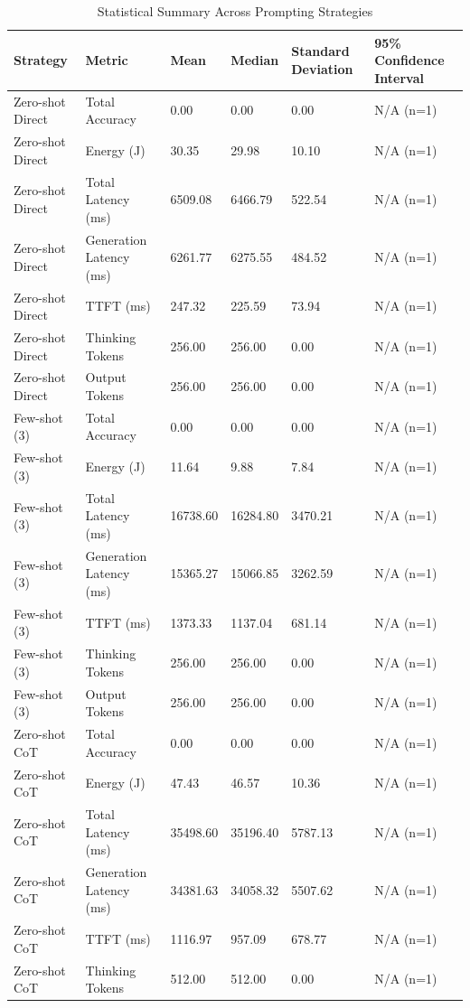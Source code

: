 \begin{table}
\caption{Statistical Summary Across Prompting Strategies}
\label{tab:statistical_summary}
\begin{tabular}{llllll}
\toprule
Strategy & Metric & Mean & Median & Standard Deviation & 95\% Confidence Interval \\
\midrule
Zero-shot Direct & Total Accuracy & 0.00 & 0.00 & 0.00 & N/A (n=1) \\
Zero-shot Direct & Energy (J) & 30.35 & 29.98 & 10.10 & N/A (n=1) \\
Zero-shot Direct & Total Latency (ms) & 6509.08 & 6466.79 & 522.54 & N/A (n=1) \\
Zero-shot Direct & Generation Latency (ms) & 6261.77 & 6275.55 & 484.52 & N/A (n=1) \\
Zero-shot Direct & TTFT (ms) & 247.32 & 225.59 & 73.94 & N/A (n=1) \\
Zero-shot Direct & Thinking Tokens & 256.00 & 256.00 & 0.00 & N/A (n=1) \\
Zero-shot Direct & Output Tokens & 256.00 & 256.00 & 0.00 & N/A (n=1) \\
Few-shot (3) & Total Accuracy & 0.00 & 0.00 & 0.00 & N/A (n=1) \\
Few-shot (3) & Energy (J) & 11.64 & 9.88 & 7.84 & N/A (n=1) \\
Few-shot (3) & Total Latency (ms) & 16738.60 & 16284.80 & 3470.21 & N/A (n=1) \\
Few-shot (3) & Generation Latency (ms) & 15365.27 & 15066.85 & 3262.59 & N/A (n=1) \\
Few-shot (3) & TTFT (ms) & 1373.33 & 1137.04 & 681.14 & N/A (n=1) \\
Few-shot (3) & Thinking Tokens & 256.00 & 256.00 & 0.00 & N/A (n=1) \\
Few-shot (3) & Output Tokens & 256.00 & 256.00 & 0.00 & N/A (n=1) \\
Zero-shot CoT & Total Accuracy & 0.00 & 0.00 & 0.00 & N/A (n=1) \\
Zero-shot CoT & Energy (J) & 47.43 & 46.57 & 10.36 & N/A (n=1) \\
Zero-shot CoT & Total Latency (ms) & 35498.60 & 35196.40 & 5787.13 & N/A (n=1) \\
Zero-shot CoT & Generation Latency (ms) & 34381.63 & 34058.32 & 5507.62 & N/A (n=1) \\
Zero-shot CoT & TTFT (ms) & 1116.97 & 957.09 & 678.77 & N/A (n=1) \\
Zero-shot CoT & Thinking Tokens & 512.00 & 512.00 & 0.00 & N/A (n=1) \\

\end{tabular}
\end{table}
